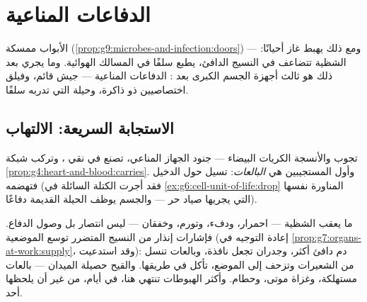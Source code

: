 \chapter{الدفاعات المناعية}\label{ch:g9:immune-defenses}

الأبواب ممسكة
(\cref{prop:g9:microbes-and-infection:doors}) --- ومع
ذلك يهبط غاز أحيانًا:  الشظية تتضاعف في النسيج
الدافئ،  يطبع سلفًا في  المسالك الهوائية.
وما يجري بعد ذلك هو ثالث أجهزة الجسم الكبرى بعد 
: الدفاعات المناعية --- جيش قائم، وفيلق
اختصاصيين ذو ذاكرة، وحيلة  التي تدربه سلفًا.

\section{الاستجابة السريعة: الالتهاب}

\begin{definition}\label{def:g9:immune-defenses:standing}
تجوب  والأنسجة الكريات البيضاء ---
جنود الجهاز المناعي، تصنع في نقي ، وتركب شبكة
\cref{prop:g4:heart-and-blood:carries}. وأول المستجيبين
هي \emph{البالعات}:  تسيل حول الدخيل فتهضمه (فقد
أجرت الكتلة السائلة في
\cref{ex:g6:cell-unit-of-life:drop} المناورة نفسها التي
يجريها صياد حر --- والجسم يوظف الحيلة القديمة دفاعًا).
\end{definition}

\begin{proposition}\label{prop:g9:immune-defenses:inflammation}
ما يعقب الشظية --- احمرار، ودفء، وتورم، وخفقان --- ليس
انتصار  بل وصول الدفاع. فإشارات إنذار من النسيج
المتضرر توسع  الموضعية (إعادة التوجيه في
\cref{prop:g7:organs-at-work:supply}، وقد استدعيت): دم
دافئ أكثر، وجدران تجعل نافذة، وبالعات تنسل من الشعيرات
وتزحف إلى الموضع، تأكل  في طريقها. والقيح حصيلة
الميدان --- بالعات مستهلكة، وغزاة موتى، وحطام. وأكثر
الهبوطات تنتهي هنا، في أيام، من غير أن يلحظها أحد.
\end{proposition}
\admitted

